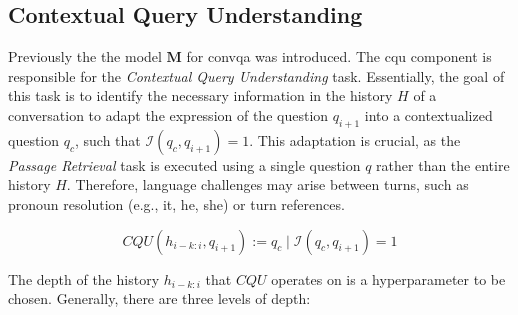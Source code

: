 







\subsection{Contextual Query Understanding}
\label{subsec:cqu}

Previously the the model $\mathbf{M}$ for \gls{convqa} was introduced. The \gls{cqu} component is responsible for the \textit{Contextual Query Understanding} task. Essentially, the goal of this task is to identify the necessary information in the history $H$ of a conversation to adapt the expression of the question $q_{i+1}$ into a contextualized question $q_c$, such that $\mathcal{I}(q_c, q_{i+1}) = 1$. This adaptation is crucial, as the \textit{Passage Retrieval} task is executed using a single question $q$ rather than the entire history $H$. Therefore, language challenges may arise between turns, such as pronoun resolution (e.g., it, he, she) or turn references.

\begin{equation}
    CQU(h_{i-k:i}, q_{i+1}) := q_c \mid \mathcal{I}(q_c, q_{i+1}) = 1
\end{equation}

The depth of the history $h_{i-k:i}$ that $CQU$ operates on is a hyperparameter to be chosen. Generally, there are three levels of depth:

